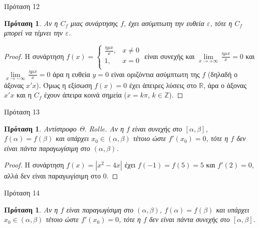 \documentclass[greek]{beamer}
\newtheorem{proposition}[theorem]{Πρόταση}
\begin{document}
\begin{frame}{Πρόταση 12}
 \begin{proposition}
  \normalfont Αν η ${{C}_{f}}$ μιας συνάρτησης $f$, έχει ασύμπτωτη την ευθεία $\varepsilon $, τότε η ${{C}_{f}}$ μπορεί να τέμνει την $\varepsilon $.
 \end{proposition}
 \begin{proof}
  Η συνάρτηση $f\left( x \right)=\left\{ \begin{array}{*{35}{l}}
    \frac{\eta \mu x}{x}, & x\ne 0 \\
    1,                    & x=0    \\
   \end{array} \right.$ είναι συνεχής και $\underset{x\to +\infty }{\mathop{\lim }}\,\frac{\eta \mu x}{x}=0$ και $\underset{x\to -\infty }{\mathop{\lim }}\,\frac{\eta \mu x}{x}=0$
  άρα η ευθεία $y=0$ είναι οριζόντια ασύμπτωτη της $f$ (δηλαδή ο άξονας $x'x$). Όμως η εξίσωση $f\left( x \right)=0$ έχει άπειρες λύσεις στο $\mathbb{R}$, άρα ο άξονας $x'x$ και η ${{C}_{f}}$ έχουν άπειρα κοινά σημεία ($x=k\pi $, $k\in \mathbb{Z}$).
 \end{proof}
\end{frame}

\begin{frame}{Πρόταση 13}
 \begin{proposition}
  \normalfont Αντίστροφο Θ. Rolle. Αν η $f$ είναι συνεχής στο $\left[ \alpha ,\beta  \right]$, $f\left( \alpha  \right)=f\left( \beta  \right)$ και υπάρχει ${{x}_{0}}\in \left( \alpha ,\beta  \right)$ τέτοιο ώστε $f'\left( {{x}_{0}} \right)=0$, τότε η $f$ δεν είναι πάντα παραγωγίσιμη στο $\left( \alpha ,\beta  \right)$.
 \end{proposition}
 \begin{proof}
  Η συνάρτηση $f\left( x \right)=\left| {{x}^{2}}-4x \right|$ έχει $f\left( -1 \right)=f\left( 5 \right)=5$ και $f'\left( 2 \right)=0$, αλλά δεν είναι παραγωγίσιμη στο $0$.
 \end{proof}
\end{frame}

\begin{frame}{Πρόταση 14}
 \begin{proposition}
  \normalfont Αν η $f$ είναι παραγωγίσιμη στο $\left( \alpha ,\beta  \right)$, $f\left( \alpha  \right)=f\left( \beta  \right)$ και υπάρχει ${{x}_{0}}\in \left( \alpha ,\beta  \right)$ τέτοιο ώστε $f'\left( x_0 \right)=0$, τότε η $f$ δεν είναι πάντα συνεχής στο $\left[ \alpha ,\beta  \right]$.
 \end{proposition}
\end{frame}
\end{document}
